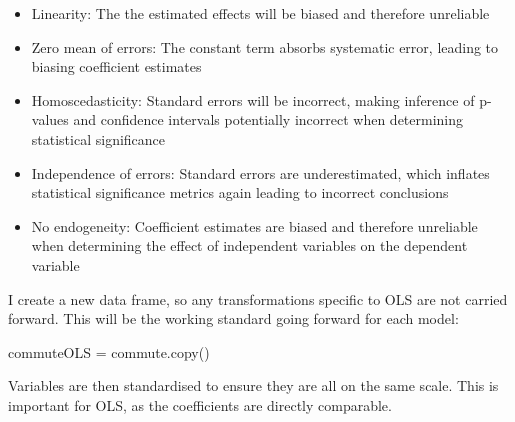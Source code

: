 \documentclass[
  number]{elsarticle}
\newenvironment{Shaded}{\begin{snugshade}}{\end{snugshade}}
\newcommand{\NormalTok}[1]{\textcolor[rgb]{0.00,0.23,0.31}{#1}}
\newcommand{\OperatorTok}[1]{\textcolor[rgb]{0.37,0.37,0.37}{#1}}
\begin{document}
\begin{tcolorbox}
\begin{itemize}
\item
  Linearity: The the estimated effects will be biased and therefore
  unreliable
\item
  Zero mean of errors: The constant term absorbs systematic error,
  leading to biasing coefficient estimates
\item
  Homoscedasticity: Standard errors will be incorrect, making inference
  of p-values and confidence intervals potentially incorrect when
  determining statistical significance
\item
  Independence of errors: Standard errors are underestimated, which
  inflates statistical significance metrics again leading to incorrect
  conclusions
\item
  No endogeneity: Coefficient estimates are biased and therefore
  unreliable when determining the effect of independent variables on the
  dependent variable
\end{itemize}

\end{tcolorbox}

I create a new data frame, so any transformations specific to OLS are
not carried forward. This will be the working standard going forward for
each model:

\begin{Shaded}
\begin{Highlighting}[]
\NormalTok{commuteOLS }\OperatorTok{=}\NormalTok{ commute.copy()}
\end{Highlighting}
\end{Shaded}

Variables are then standardised to ensure they are all on the same
scale. This is important for OLS, as the coefficients are directly
comparable.
\end{document}

